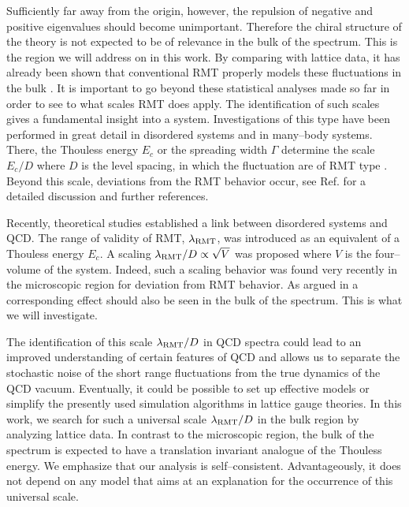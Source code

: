 Sufficiently far away from the origin, however, the repulsion of
negative and positive eigenvalues should become unimportant.
Therefore the chiral structure of the theory is not expected to be of
relevance in the bulk of the spectrum.  This is the region we will
address on in this work. By comparing with lattice data, it has
already been shown that conventional RMT properly models these
fluctuations in the bulk \cite{halasz95,halasz97,verbaar97}.  It is
important to go beyond these statistical analyses made so far in order
to see to what scales RMT does apply. The identification of such
scales gives a fundamental insight into a system. Investigations of
this type have been performed in great detail in disordered systems
and in many--body systems.  There, the Thouless energy $E_c$ or the
spreading width $\Gamma$ determine the scale $E_c/D$ where $D$ is the
level spacing, in which the fluctuation are of RMT type
\cite{thou75,thou77}.  Beyond this scale, deviations from the RMT
behavior occur, see Ref.\cite{guhr97} for a detailed discussion and
further references.

Recently, theoretical studies \cite{stern98,osborn98,janik98}
established a link between disordered systems and QCD. The range of
validity of RMT, $\lambda_{\rm RMT}$, was introduced as an equivalent
of a Thouless energy $E_c$. A scaling $\lambda_{\rm RMT}/D \propto
\sqrt{V}$ was proposed where $V$ is the four--volume of the system.
Indeed, such a scaling behavior was found very recently in the
microscopic region \cite{bitsch98} for deviation from RMT behavior. As
argued in \cite{osborn98} a corresponding effect should also be seen
in the bulk of the spectrum. This is what we will investigate.

The identification of this scale $\lambda_{\rm RMT}/D$ in QCD spectra
could lead to an improved understanding of certain features of QCD and
allows us to separate the stochastic noise of the short range
fluctuations from the true dynamics of the QCD vacuum. Eventually, it
could be possible to set up effective models or simplify the presently
used simulation algorithms in lattice gauge theories.  In this work,
we search for such a universal scale $\lambda_{\rm RMT}/D$ in the bulk
region by analyzing lattice data.  In contrast to the microscopic
region, the bulk of the spectrum is expected to have a translation
invariant analogue of the Thouless energy.  We emphasize that our
analysis is self--consistent. Advantageously, it does not depend on
any model that aims at an explanation for the occurrence of this
universal scale.

